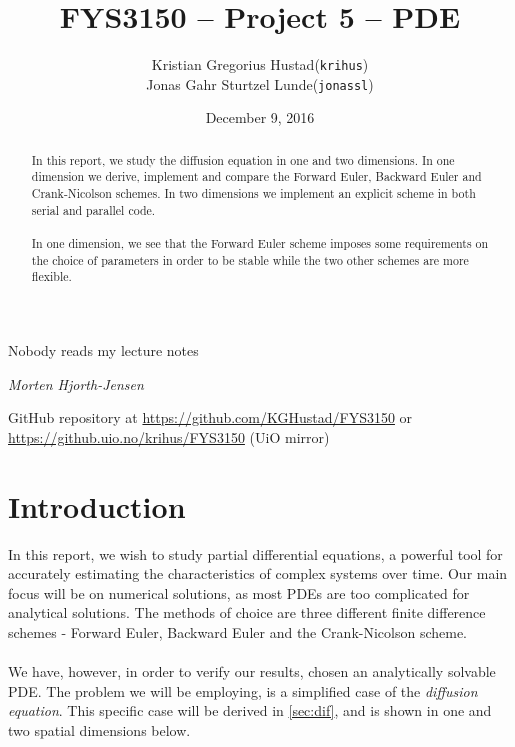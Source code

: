 \documentclass[10pt,a4paper]{article}
\begin{document}
\title{FYS3150 -- Project 5 -- PDE}
\author{
	\begin{tabular}{rl}
        Kristian Gregorius Hustad & (\texttt{krihus})\\
        Jonas Gahr Sturtzel Lunde & (\texttt{jonassl})
	\end{tabular}}
\date{December 9, 2016}
\maketitle



\setlength{\epigraphwidth}{0.75\textwidth}
\renewcommand{\epigraphflush}{center}
\renewcommand{\beforeepigraphskip}{50pt}
\renewcommand{\afterepigraphskip}{100pt}
\renewcommand{\epigraphsize}{\normalsize}
\epigraph{Nobody reads my lecture notes}
	{\textit{Morten Hjorth-Jensen}}

\begin{abstract}
\noindent
In this report, we study the diffusion equation in one and two dimensions. In one dimension we derive, implement and compare the Forward Euler, Backward Euler and Crank-Nicolson schemes. In two dimensions we implement an explicit scheme in both serial and parallel code.\\\\
In one dimension, we see that the Forward Euler scheme imposes some requirements on the choice of parameters in order to be stable while the two other schemes are more flexible.


\end{abstract}

\vfill


\begin{center}
    GitHub repository at \url{https://github.com/KGHustad/FYS3150}
    or \url{https://github.uio.no/krihus/FYS3150} (UiO mirror)
\end{center}


\pagebreak

\tableofcontents



\section{Introduction}
In this report, we wish to study partial differential equations, a powerful tool for accurately estimating the characteristics of complex systems over time. Our main focus will be on numerical solutions, as most PDEs are too complicated for analytical solutions. The methods of choice are three different finite difference schemes - Forward Euler, Backward Euler and the Crank-Nicolson scheme.
\\\\
We have, however, in order to verify our results, chosen an analytically solvable PDE. The problem we will be employing, is a simplified case of the \textit{diffusion equation}. This specific case will be derived in \vref{sec:dif}, and is shown in one and two spatial dimensions below.
\end{document}
